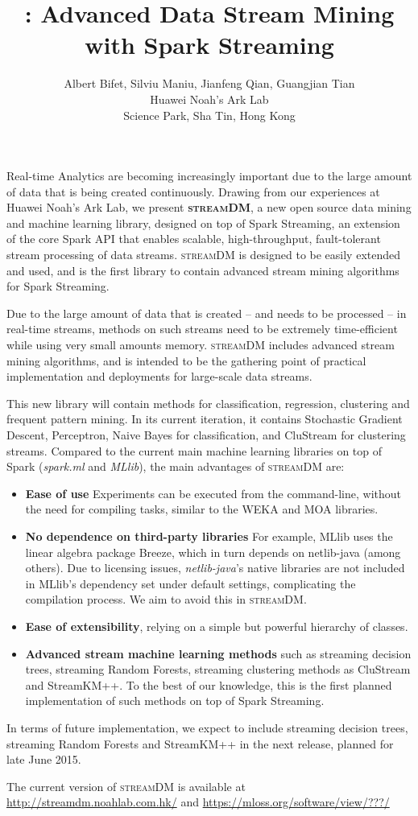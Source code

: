 \documentclass[a4paper,11pt]{article}
\title{\streamdm: Advanced Data Stream Mining with Spark Streaming}
\author{Albert Bifet, Silviu Maniu, Jianfeng Qian, Guangjian Tian\\
Huawei Noah's Ark Lab \\
Science Park, Sha Tin, Hong Kong
}
\date{}
\def\streamdm{\textsc{streamDM}\xspace}
\begin{document}
\maketitle



Real-time Analytics are becoming increasingly important due to the large amount
of data that is being created continuously. Drawing from our experiences at
Huawei Noah's Ark Lab, we present {\bf \streamdm}, a new open source data mining and
machine learning library, designed on top of Spark Streaming, an extension of
the core Spark API that enables scalable, high-throughput, fault-tolerant stream
processing of data streams.  \streamdm is designed to be easily extended and
used, and is the first library to contain advanced stream mining algorithms for
Spark Streaming. 
 
Due to the large amount of data that is created -- and needs to
be processed -- in real-time streams, methods on such streams need to be extremely
time-efficient while using very small amounts memory. \streamdm
includes advanced stream mining algorithms, and is intended to be the gathering
point of practical implementation and deployments for large-scale data
streams.

This new library will contain methods for classification, regression, clustering
and frequent pattern mining. In its current iteration, it contains Stochastic
Gradient Descent, Perceptron, Naive Bayes for classification, and CluStream for
clustering streams. Compared to the current main machine learning libraries on
top of Spark (\emph{spark.ml} and \emph{MLlib}), the main advantages of
\streamdm are:
\begin{itemize}
  \item {\bf Ease of use} Experiments can be executed from the command-line, without
   the need for compiling tasks, similar to the WEKA and MOA libraries.
 \item {\bf No dependence on third-party libraries} For example, MLlib uses the
   linear algebra package Breeze, which in turn depends on netlib-java (among
   others).  Due to licensing issues, \emph{netlib-java}'s native libraries are
   not included in MLlib’s dependency set under default settings, complicating
   the compilation process. We aim to avoid this in \streamdm. 
 \item {\bf Ease of extensibility}, relying on a simple but powerful hierarchy of
   classes.
 \item {\bf Advanced stream machine learning methods} such as streaming decision trees,
   streaming Random Forests, streaming clustering methods as CluStream and
   StreamKM++. To the best of our knowledge, this is the first planned
   implementation of such methods on top of Spark Streaming.
\end{itemize}

In terms of future implementation, we expect to include streaming decision
trees, streaming Random Forests and StreamKM++ in the next release, planned for
late June 2015.

The current version of \streamdm is available at
\url{http://streamdm.noahlab.com.hk/} and \url{https://mloss.org/software/view/???/}
\end{document}
